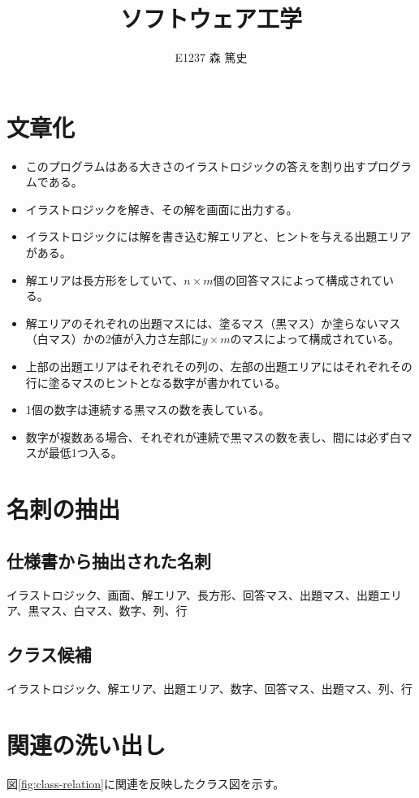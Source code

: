 \documentclass[a4j]{jarticle}
\begin{document}
\title{ソフトウェア工学}

\author{E1237 森 篤史}


\maketitle

\section{文章化}
\begin{itemize}
 \item このプログラムはある大きさのイラストロジックの答えを割り出すプログラムである。
 \item イラストロジックを解き、その解を画面に出力する。
 \item イラストロジックには解を書き込む解エリアと、ヒントを与える出題エリアがある。
 \item 解エリアは長方形をしていて、$n\times m$個の回答マスによって構成されている。
 \item 解エリアのそれぞれの出題マスには、塗るマス（黒マス）か塗らないマス（白マス）かの2値が入力さ左部に$y \times m$のマスによって構成されている。
 \item 上部の出題エリアはそれぞれその列の、左部の出題エリアにはそれぞれその行に塗るマスのヒントとなる数字が書かれている。
 \item 1個の数字は連続する黒マスの数を表している。
 \item 数字が複数ある場合、それぞれが連続で黒マスの数を表し、間には必ず白マスが最低1つ入る。
\end{itemize}

\section{名刺の抽出}
\subsection{仕様書から抽出された名刺}
イラストロジック、画面、解エリア、長方形、回答マス、出題マス、出題エリア、黒マス、白マス、数字、列、行

\subsection{クラス候補}
イラストロジック、解エリア、出題エリア、数字、回答マス、出題マス、列、行

\section{関連の洗い出し}
図\ref{fig:class-relation}に関連を反映したクラス図を示す。
\end{document}

